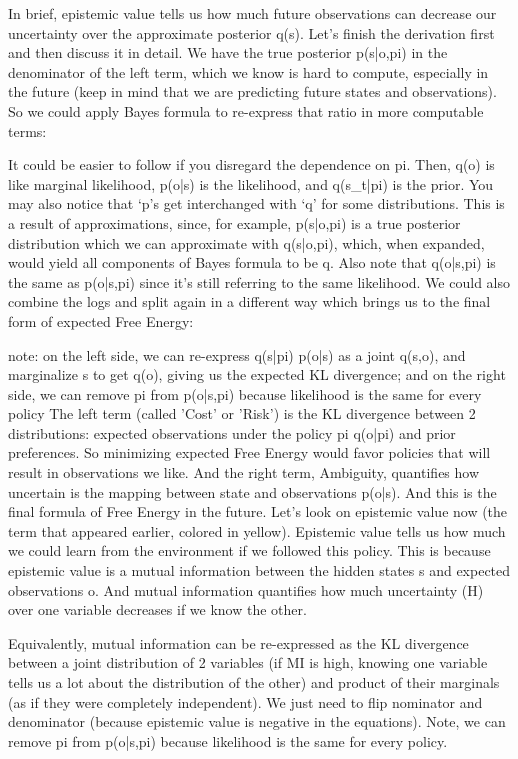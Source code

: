 \documentclass[12pt]{article}
\begin{document}
In brief, epistemic value tells us how much future observations can decrease our uncertainty over the approximate posterior q(s). Let's finish the derivation first and then discuss it in detail. We have the true posterior p(s|o,pi) in the denominator of the left term, which we know is hard to compute, especially in the future (keep in mind that we are predicting future states and observations). So we could apply Bayes formula to re-express that ratio in more computable terms:

It could be easier to follow if you disregard the dependence on pi. Then, q(o) is like marginal likelihood, p(o|s) is the likelihood, and q(s\_t|pi) is the prior. You may also notice that ‘p’s get interchanged with ‘q’ for some distributions. This is a result of approximations, since, for example, p(s|o,pi) is a true posterior distribution which we can approximate with q(s|o,pi), which, when expanded, would yield all components of Bayes formula to be q. Also note that q(o|s,pi) is the same as p(o|s,pi) since it’s still referring to the same likelihood.
We could also combine the logs and split again in a different way which brings us to the final form of expected Free Energy:

note: on the left side, we can re-express q(s|pi) p(o|s) as a joint q(s,o), and marginalize s to get q(o), giving us the expected KL divergence; and on the right side, we can remove pi from p(o|s,pi) because likelihood is the same for every policy
The left term (called 'Cost' or 'Risk') is the KL divergence between 2 distributions: expected observations under the policy pi q(o|pi) and prior preferences. So minimizing expected Free Energy would favor policies that will result in observations we like. And the right term, Ambiguity, quantifies how uncertain is the mapping between state and observations p(o|s). And this is the final formula of Free Energy in the future. Let's look on epistemic value now (the term that appeared earlier, colored in yellow).
Epistemic value tells us how much we could learn from the environment if we followed this policy. This is because epistemic value is a mutual information between the hidden states s and expected observations o. And mutual information quantifies how much uncertainty (H) over one variable decreases if we know the other.

Equivalently, mutual information can be re-expressed as the KL divergence between a joint distribution of 2 variables (if MI is high, knowing one variable tells us a lot about the distribution of the other) and product of their marginals (as if they were completely independent). We just need to flip nominator and denominator (because epistemic value is negative in the equations). Note, we can remove pi from p(o|s,pi) because likelihood is the same for every policy.
\end{document}
